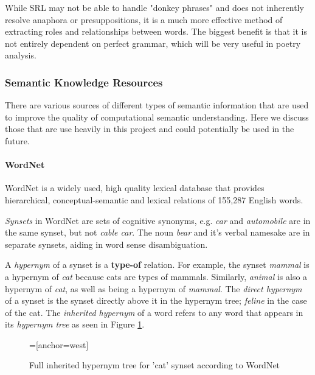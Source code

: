 While SRL may not be able to handle "donkey phrases" and does not inherently resolve anaphora or presuppositions, it is a much more effective method of extracting roles and relationships between words. The biggest benefit is that it is not entirely dependent on perfect grammar, which will be very useful in poetry analysis.


\subsubsection{Semantic Knowledge Resources}
\label{sec:sem-net}
There are various sources of different types of semantic information that are used to improve the quality of computational semantic understanding. Here we discuss those that are use heavily in this project and could potentially be used in the future.

\paragraph{WordNet}
WordNet is a widely used, high quality lexical database that provides hierarchical, conceptual-semantic and lexical relations of 155,287 English words\cite{miller1995wordnet}. 

\textit{Synsets} in WordNet are sets of cognitive synonyms, e.g. \textit{car} and \textit{automobile} are in the same synset, but not \textit{cable car}. The noun \textit{bear} and it's verbal namesake are in separate synsets, aiding in word sense disambiguation.

A \textit{hypernym} of a synset is a \textbf{type-of} relation. For example, the synset \textit{mammal} is a hypernym of \textit{cat} because cats are types of mammals. Similarly, \textit{animal} is also a hypernym of \textit{cat}, as well as being a hypernym of \textit{mammal}. The \textit{direct hypernym} of a synset is the synset directly above it in the hypernym tree; \textit{feline} in the case of the cat. The \textit{inherited hypernym} of a word refers to any word that appears in its \textit{hypernym tree} as seen in Figure \ref{fig:hypernym-tree-cat}. 

\begin{figure}[h!]
\centering
{}=[anchor=west]
\caption{Full inherited hypernym tree for 'cat' synset according to WordNet}
\label{fig:hypernym-tree-cat}
\end{figure}

